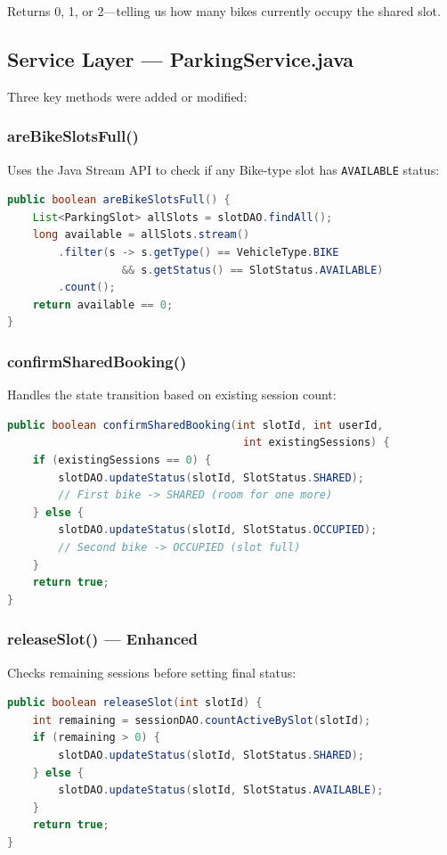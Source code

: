 \documentclass[12pt,a4paper]{article}
\begin{document}
Returns 0, 1, or 2---telling us how many bikes currently occupy the shared slot.

\subsection{Service Layer — ParkingService.java}

Three key methods were added or modified:

\subsubsection{areBikeSlotsFull()}
Uses the Java Stream API to check if any Bike-type slot has \texttt{AVAILABLE} status:

\begin{lstlisting}[language=Java, caption={Bike Slot Full Check}]
public boolean areBikeSlotsFull() {
    List<ParkingSlot> allSlots = slotDAO.findAll();
    long available = allSlots.stream()
        .filter(s -> s.getType() == VehicleType.BIKE 
                  && s.getStatus() == SlotStatus.AVAILABLE)
        .count();
    return available == 0;
}
\end{lstlisting}

\subsubsection{confirmSharedBooking()}
Handles the state transition based on existing session count:

\begin{lstlisting}[language=Java, caption={Shared Booking Confirmation}]
public boolean confirmSharedBooking(int slotId, int userId, 
                                     int existingSessions) {
    if (existingSessions == 0) {
        slotDAO.updateStatus(slotId, SlotStatus.SHARED);
        // First bike -> SHARED (room for one more)
    } else {
        slotDAO.updateStatus(slotId, SlotStatus.OCCUPIED);
        // Second bike -> OCCUPIED (slot full)
    }
    return true;
}
\end{lstlisting}

\subsubsection{releaseSlot() — Enhanced}
Checks remaining sessions before setting final status:

\begin{lstlisting}[language=Java, caption={Enhanced Slot Release}]
public boolean releaseSlot(int slotId) {
    int remaining = sessionDAO.countActiveBySlot(slotId);
    if (remaining > 0) {
        slotDAO.updateStatus(slotId, SlotStatus.SHARED);
    } else {
        slotDAO.updateStatus(slotId, SlotStatus.AVAILABLE);
    }
    return true;
}
\end{lstlisting}
\end{document}
